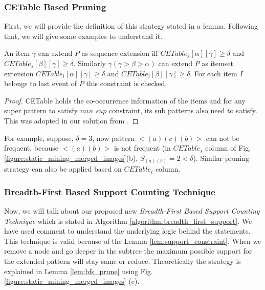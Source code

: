 \subsubsection{CETable Based Pruning}
First, we will provide the definition of this strategy stated in a lemma. Following that, we will give some examples to understand it.
\begin{lem} \label{lem:cetable}
   An item $\gamma$ can extend $P$ as sequence extension iff $CETable_{s}[\alpha][\gamma] \geq \delta$ and $CETable_{s}[\beta][\gamma] \geq \delta$. Similarly $\gamma(\gamma > \beta > \alpha)$ can extend $P$ as itemset extension  $CETable_{i}[\alpha][\gamma] \geq \delta$ and $CETable_{i}[\beta][\gamma] \geq \delta$. For each item $I$ belongs to last event of $P$ this constraint is checked.
\end{lem}
\begin{proof}
    CETable holds the co-occurrence information of the items and for any super pattern to satisfy $min\_sup$ constraint, its sub patterns also need to satisfy. This was adopted in our solution from \cite{fournier2014fast}.
\end{proof}

For example, suppose, $\delta=3$, now pattern $< (a)(c)(b) >$ can not be frequent, because $<(a)(b) >$ is not frequent (in $CETable_{s}$ column of Fig. \ref{figure:static_mining_merged_images}(b), $S_{(a)(b)}=2 < \delta$). Similar pruning strategy can also be applied based on $CETable_{i}$ column.

\subsubsection{Breadth-First Based Support Counting Technique}

Now, we will talk about our proposed new \textit{Breadth-First Based Support Counting Technique} which is stated in Algorithm \ref{algorithm:breadth_first_support}. We have used comment to understand the underlying logic behind the statements. This technique is valid because of the Lemma \ref{lem:support_constraint}. When we remove a node and go deeper in the subtree the maximum possible support for the extended pattern will stay same or reduce. Theoretically the strategy is explained in Lemma \ref{lem:bfs_prune} using Fig. \ref{figure:static_mining_merged_images} (e).

